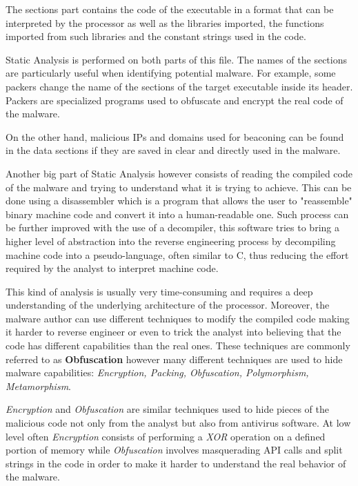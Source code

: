 The sections part contains the code of the executable in a format that can be interpreted by the processor as well as the libraries imported, the functions imported from such libraries and the constant strings used in the code.

Static Analysis is performed on both parts of this file. The names of the sections are particularly useful when identifying potential malware. For example, some packers change the name of the sections of the target executable inside its header. Packers are specialized programs used to obfuscate and encrypt the real code of the malware.

 On the other hand, malicious IPs and domains used for beaconing can be found in the data sections if they are saved in clear and directly used in the malware.  

Another big part of Static Analysis however consists of reading the compiled code of the malware and trying to understand what it is trying to achieve. This can be done using a disassembler which is a program that allows the user to "reassemble" binary machine code and convert it into a human-readable one. Such process can be further improved with the use of a decompiler, this software tries to bring a higher level of abstraction into the reverse engineering process by decompiling machine code into a pseudo-language, often similar to C, thus reducing the effort required by the analyst to interpret machine code.

This kind of analysis is usually very time-consuming and requires a deep understanding of the underlying architecture of the processor. Moreover, the malware author can use different techniques to modify the compiled code making it harder to reverse engineer or even to trick the analyst into believing that the code has different capabilities than the real ones. These techniques are commonly referred to as \textbf{Obfuscation} however many different techniques are used to hide malware capabilities: \textit{Encryption, Packing, Obfuscation, Polymorphism, Metamorphism}.\cite{Ye2017ASO}

\textit{Encryption} and \textit{Obfuscation} are similar techniques used to hide pieces of the malicious code not only from the analyst but also from antivirus software. At low level often \textit{Encryption} consists of performing a \textit{XOR} operation on a defined portion of memory while \textit{Obfuscation} involves masquerading API calls and split strings in the code in order to make it harder to understand the real behavior of the malware.

